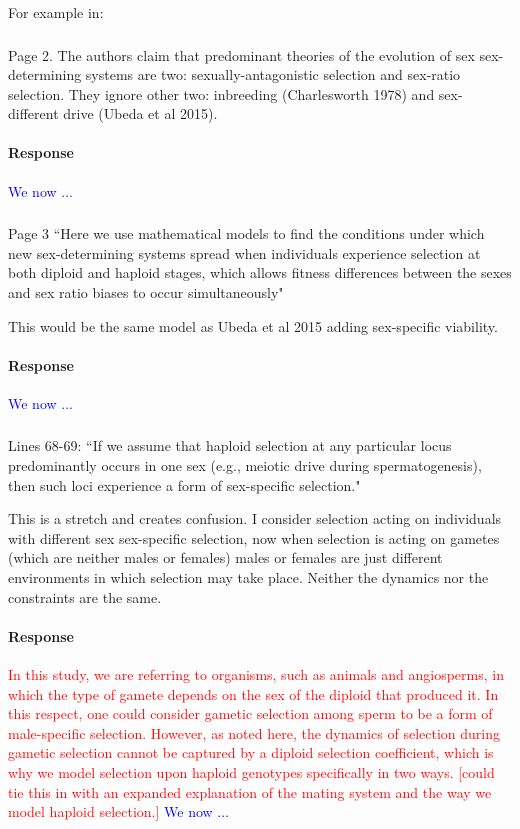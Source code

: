 \documentclass[10pt,letterpaper]{article}
\begin{document}
For example in:

\noindent\subsubsection{}
Page 2. The authors claim that predominant theories of the evolution of sex sex-determining systems are two: sexually-antagonistic selection and sex-ratio selection. They ignore other two: inbreeding (Charlesworth 1978) and sex-different drive (Ubeda et al 2015). 

\noindent\paragraph{Response}
\textcolor{blue}{We now ...}

\noindent\subsubsection{}
Page 3 ``Here we use mathematical models to find the conditions under which new sex-determining systems spread when individuals experience selection at both diploid and haploid stages, which allows fitness differences between the sexes and sex ratio biases to occur simultaneously"

This would be the same model as Ubeda et al 2015 adding sex-specific viability.

\noindent\paragraph{Response}
\textcolor{blue}{We now ...}

\noindent\subsubsection{}
Lines 68-69: ``If we assume that haploid selection at any particular locus predominantly occurs in one sex (e.g., meiotic drive during spermatogenesis), then such loci experience a form of sex-specific selection." 

This is a stretch and creates confusion. I consider selection acting on individuals with different sex sex-specific selection, now when selection is acting on gametes (which are neither males or females) males or females are just different environments in which selection may take place. Neither the dynamics nor the constraints are the same. 

\noindent\paragraph{Response}
\textcolor{red}{In this study, we are referring to organisms, such as animals and angiosperms, in which the type of gamete depends on the sex of the diploid that produced it. In this respect, one could consider gametic selection among sperm to be a form of male-specific selection. However, as noted here, the dynamics of selection during gametic selection cannot be captured by a diploid selection coefficient, which is why we model selection upon haploid genotypes specifically in two ways. [could tie this in with an expanded explanation of the mating system and the way we model haploid selection.]}
\textcolor{blue}{We now ...}
\end{document}
